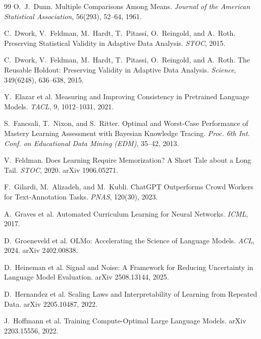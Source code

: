 \documentclass[11pt]{article}
\theoremstyle{plain}
\theoremstyle{definition}
\theoremstyle{remark}
\begin{document}
\begin{thebibliography}{99}
 O.~J.~Dunn. Multiple Comparisons Among Means. \emph{Journal
of the American Statistical Association}, 56(293), 52--64, 1961.

 C.~Dwork, V.~Feldman, M.~Hardt, T.~Pitassi,
O.~Reingold, and A.~Roth. Preserving Statistical Validity in Adaptive Data Analysis. \emph{STOC},
2015.

 C.~Dwork, V.~Feldman, M.~Hardt, T.~Pitassi,
O.~Reingold, and A.~Roth. The Reusable Holdout: Preserving Validity in Adaptive Data Analysis.
\emph{Science}, 349(6248), 636--638, 2015.

 Y.~Elazar et al. Measuring and Improving
Consistency in Pretrained Language Models. \emph{TACL}, 9, 1012--1031, 2021.

 S.~Fancsali, T.~Nixon, and S.~Ritter. Optimal
and Worst-Case Performance of Mastery Learning Assessment with Bayesian Knowledge Tracing.
\emph{Proc. 6th Int. Conf. on Educational Data Mining (EDM)}, 35--42, 2013.

 V.~Feldman. Does Learning Require Memorization? A Short Tale
about a Long Tail. \emph{STOC}, 2020. arXiv 1906.05271.

 F.~Gilardi, M.~Alizadeh, and M.~Kubli. ChatGPT
Outperforms Crowd Workers for Text-Annotation Tasks. \emph{PNAS}, 120(30), 2023.

 A.~Graves et al. Automated Curriculum Learning for Neural
Networks. \emph{ICML}, 2017.

 D.~Groeneveld et al. OLMo: Accelerating the
Science of Language Models. \emph{ACL}, 2024. arXiv 2402.00838.

 D.~Heineman et al. Signal and Noise: A Framework
for Reducing Uncertainty in Language Model Evaluation. arXiv 2508.13144, 2025.

 D.~Hernandez et al. Scaling Laws and
Interpretability of Learning from Repeated Data. arXiv 2205.10487, 2022.

 J.~Hoffmann et al. Training Compute-Optimal
Large Language Models. arXiv 2203.15556, 2022.


\end{thebibliography}
\end{document}
